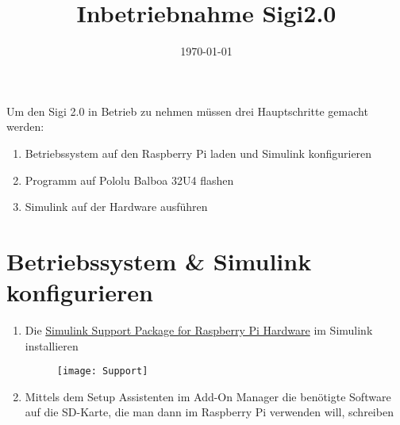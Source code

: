 \documentclass[a4paper]{article}
\title{Inbetriebnahme Sigi2.0}
\date{\today}
\begin{document}
\maketitle
Um den Sigi 2.0 in Betrieb zu nehmen müssen drei Hauptschritte gemacht werden:
\begin{enumerate}
	\item Betriebssystem auf den Raspberry Pi laden und Simulink konfigurieren
	\item Programm auf Pololu Balboa 32U4 flashen
	\item Simulink auf der Hardware ausführen
\end{enumerate}

\section*{Betriebssystem \& Simulink konfigurieren}
\begin{enumerate}
	\item Die \hyperref{https://ch.mathworks.com/matlabcentral/fileexchange/40313-simulink-support-package-for-raspberry-pi-hardware}{}{}{Simulink Support Package for Raspberry Pi Hardware} im Simulink installieren
	
\begin{figure}[h]
	\centering
	\texttt{[image: Support]}
	\caption[Supportpackage]\label{Support Package}
\end{figure}


	\item Mittels dem Setup Assistenten im Add-On Manager die benötigte Software auf die SD-Karte, die man dann im Raspberry Pi verwenden will, schreiben
\end{enumerate}
\end{document}
